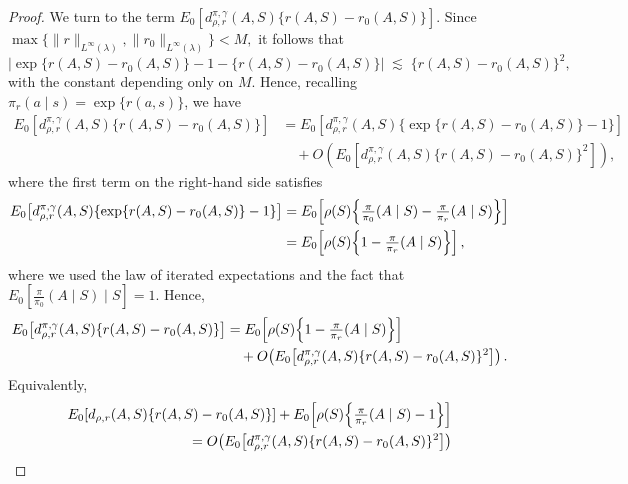 \documentclass[11pt]{article}
\theoremstyle{plain}
\begin{document}
\begin{proof}
We turn to the term $E_0\!\left[d_{\rho,r}^{\pi,\gamma}(A,S)\{r(A,S) - r_0(A,S)\}\right]$. Since
\(
\max\{\|r\|_{L^\infty(\lambda)}, \|r_0\|_{L^\infty(\lambda)}\} < M,
\) 
it follows that
\[
\left|\exp\{r(A,S) - r_0(A,S)\} - 1 - \{r(A,S) - r_0(A,S)\}\right| 
   \;\lesssim\; \{r(A,S) - r_0(A,S)\}^2,
\]
with the constant depending only on $M$. Hence, recalling $\pi_r(a \mid s) = \exp\{r(a,s)\}$, we have
\begin{align*}
E_0\!\left[d_{\rho,r}^{\pi,\gamma}(A,S)\{r(A,S) - r_0(A,S)\}\right]
&= E_0\!\left[d_{\rho,r}^{\pi,\gamma}(A,S)\{\exp\{r(A,S) - r_0(A,S)\} - 1\}\right] \\
&\quad + O\!\left(E_0\!\left[d_{\rho,r}^{\pi,\gamma}(A,S)\{r(A,S) - r_0(A,S)\}^2\right]\right),
\end{align*}
where the first term on the right-hand side satisfies
\begin{align*}
E_0\!\left[d_{\rho,r}^{\pi,\gamma}(A,S)\{\exp\{r(A,S) - r_0(A,S)\} - 1\}\right] 
&= E_0\!\left[\rho(S)\Bigl\{\tfrac{\pi}{\pi_0}(A \mid S) - \tfrac{\pi}{\pi_r}(A \mid S)\Bigr\}\right] \\
&= E_0\!\left[\rho(S)\Bigl\{1 - \tfrac{\pi}{\pi_r}(A \mid S)\Bigr\}\right],
\end{align*}
where we used the law of iterated expectations and the fact that $E_0\!\left[\tfrac{\pi}{\pi_0}(A \mid S)\mid S\right] = 1$.
Hence,
\begin{align*}
    E_0\!\left[d_{\rho,r}^{\pi,\gamma}(A,S)\{r(A,S) - r_0(A,S)\}\right]
&= E_0\!\left[\rho(S)\Bigl\{1 - \tfrac{\pi}{\pi_r}(A \mid S)\Bigr\}\right]\\
&\quad + O\!\left(E_0\!\left[d_{\rho,r}^{\pi,\gamma}(A,S)\{r(A,S) - r_0(A,S)\}^2\right]\right).
\end{align*}
Equivalently,
\begin{equation}
\label{eqn::proofsecondterm}
\begin{aligned}
   E_0\!\left[d_{\rho,r}(A,S)\{r(A,S) - r_0(A,S)\}\right] 
   + E_0\!\left[\rho(S)\Bigl\{\tfrac{\pi}{\pi_r}(A \mid S) - 1\Bigr\}\right]\\
=O\!\left(E_0\!\left[d_{\rho,r}^{\pi,\gamma}(A,S)\{r(A,S) - r_0(A,S)\}^2\right]\right)
\end{aligned}
\end{equation}



\end{proof}
\end{document}
